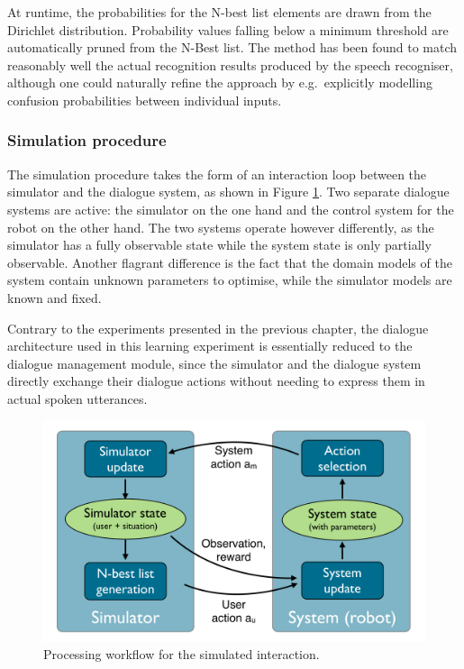 At runtime, the probabilities for the N-best list elements are drawn from the Dirichlet distribution. Probability values falling below a minimum threshold are automatically pruned from the N-Best list. The method has been found to match reasonably well the actual recognition results produced by the speech recogniser, although one could naturally refine the approach by e.g.\ explicitly modelling confusion probabilities between individual inputs. 

\subsubsection*{Simulation procedure}

The simulation procedure takes the form of an interaction loop between the simulator and the dialogue system, as shown in Figure \ref{fig:exp2_architecture}.  Two separate dialogue systems are active: the simulator on the one hand and the control system for the robot on the other hand.  The two systems operate however differently, as the simulator has a fully observable state while the system state is only partially observable.  Another flagrant difference is the fact that the domain models of the system contain unknown parameters to optimise, while the simulator models are known and fixed.

Contrary to the experiments presented in the previous chapter, the dialogue architecture used in this learning experiment is essentially reduced to the dialogue management module, since the simulator and the dialogue system directly exchange their dialogue actions without needing to express them in actual spoken utterances.   

\begin{figure}[h]
\begin{center}
\includegraphics[scale=0.3]{imgs/exp2_architecture.pdf}
\end{center} 
\caption{Processing workflow for the simulated interaction.}
\label{fig:exp2_architecture}
\end{figure}

